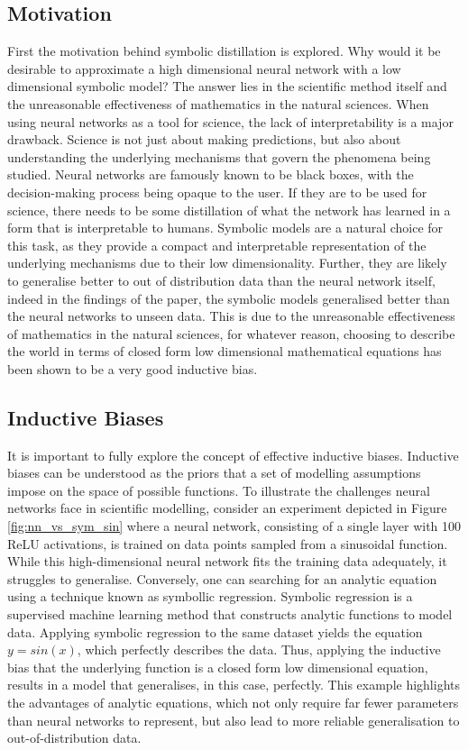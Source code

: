 \documentclass[11pt]{article}
\begin{document}
\subsection{Motivation}
First the motivation behind symbolic distillation is explored. Why would it be desirable to approximate a high dimensional neural network with a low dimensional symbolic model? The answer lies in the scientific method itself and the unreasonable effectiveness of mathematics in the natural sciences.
When using neural networks as a tool for science, the lack of interpretability is a major drawback. Science is not just about making predictions, but also about understanding the underlying mechanisms that govern the phenomena being studied. Neural networks are famously known to be black boxes, with the decision-making process being opaque to the user. If they are to be used for science, there needs to be some distillation of what the network has learned in a form that is interpretable to humans. 
Symbolic models are a natural choice for this task, as they provide a compact and interpretable representation of the underlying mechanisms due to their low dimensionality. Further, they are likely to generalise better to out of distribution data than the neural network itself, indeed in the findings of the paper, the symbolic models generalised better than the neural networks to unseen data. This is due to the unreasonable effectiveness of mathematics in the natural sciences, for whatever reason, choosing to describe the world in terms of closed form low dimensional mathematical equations has been shown to be a very good inductive bias. 

\subsection{Inductive Biases}
It is important to fully explore the concept of effective inductive biases. Inductive biases can be understood as the priors that a set of modelling assumptions impose on the space of possible functions. To illustrate the challenges neural networks face in scientific modelling, consider an experiment depicted in Figure \ref{fig:nn_vs_sym_sin} where a neural network, consisting of a single layer with 100 ReLU activations, is trained on data points sampled from a sinusoidal function. While this high-dimensional neural network fits the training data adequately, it struggles to generalise. Conversely, one can searching for an analytic equation using a technique known as symbollic regression. Symbolic regression is a supervised machine learning method that constructs analytic functions to model data. Applying symbolic regression to the same dataset yields the equation $y = sin(x)$, which perfectly describes the data. Thus, applying the inductive bias that the underlying function is a closed form low dimensional equation, results in a model that generalises, in this case, perfectly. This example highlights the advantages of analytic equations, which not only require far fewer parameters than neural networks to represent, but also lead to more reliable generalisation to out-of-distribution data. 
\end{document}
